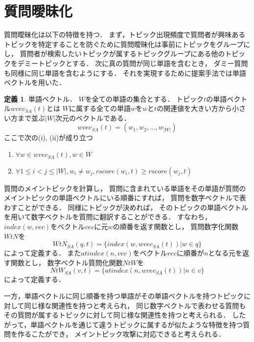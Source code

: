 \documentclass[master]{suribt}
\theoremstyle{definition}
\newtheorem{defi}[thm]{定義}
\begin{document}
 \section{質問曖昧化}
 質問曖昧化は以下の特徴を持つ．
 まず，トピック出現頻度で質問者が興味あるトピックを特定することを防ぐために質問曖昧化は事前にトピックをグループにし，
 質問者が検索したいトピックが属するトピックグループにある他のトピックをデミートピックとする．
 次に真の質問が同じ単語を含むとき， ダミー質問も同様に同じ単語を含むようにする．
 それを実現するために提案手法では単語ベクトルを用いた．
 
 \begin{defi}{単語ベクトル．}
 $W$を全ての単語の集合とする．
 トピック$t$の単語ベクトル$wvec_{SA}(t)$とは
 $W$に属する全ての単語$w$を$w$と$t$の関連値を大きい方から小さい方まで並ぶ$|W|$次元のベクトルである．
 \begin{equation}
  wvec_{SA}(t)  = (w_1,w_2, \dots , w_{|W|})
 \end{equation}
 ここで次の(i), (ii)が成り立つ
 \begin{enumerate}
 \renewcommand{\labelenumi}{(\roman{enumi})}
 \item $\forall w \in wvec_{SA}(t), w \in W$ 
 \item $\forall 1 \leq i < j \leq |W|,w_i \neq w_j,rscore(w_i,t) \geq rscore(w_j,t)$
 \end{enumerate}
 \end{defi}

 質問のメイントピックを計算し，
 質問に含まれている単語をその単語が質問のメイントピックの単語ベクトルにいる順番にすれば，
 質問を数字ベクトルで表わすことができる．
 同様にトピックが決めれば，
 そのトピックの単語ベクトルを用いて数字ベクトルを質問に翻訳することができる．
 すなわち，$index(w,vec)$をベクトル$vec$に元$w$の順番を返す関数とし，
 質問数字化関数$WtN$を
 \begin{equation}
  WtN_{SA}(q,t)  = \{index(w,wvec_{SA}(t))| w \in q\}
 \end{equation}
 によって定義する．
 また$atindex(n,vec)$をベクトル$vec$に順番が$n$となる元を返す関数とし，
 数字ベクトル質問化関数$NtW$を
 \begin{equation}
  NtW_{SA}(v,t)  = \{atindex(n,wvec_{SA}(t))| n \in v\}
 \end{equation}
 によって定義する．

 一方，単語ベクトルに同じ順番を持つ単語がその単語ベクトルを持つトピックに対して同じ様な関連性を持つと考えられ，
 同じ数字ベクトルで表わせる質問もその質問が属するトピックに対して同じ様な関連性を持つと考えられる．
 したがって，単語ベクトルを通じて違うトピックに属するが似たような特徴を持つ質問を作るこたができ，
 メイントピック攻撃に対応できると考えられる．
 
\end{document}
